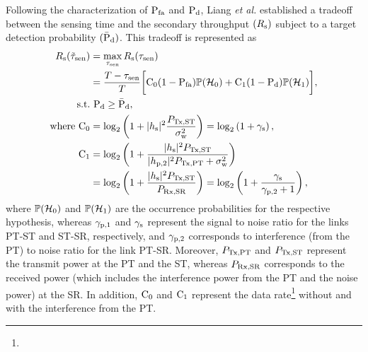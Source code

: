 Following the characterization of $\text{P}_{\text{fa}}$ and $\text{P}_{\text{d}}$, Liang \textit{et al.} \cite{Liang08} established a tradeoff between the sensing time and the secondary throughput $(R_{\text{s}})$ subject to a target detection probability $(\bar{\text{P}}_{\text{d}})$. This tradeoff is represented as  
\begin{align}
R_{\text{s}}(\tilde{\tau}_{\text{sen}}) &= \operatorname*{max}_{\tau_{\text{sen}}} R_{\text{s}}(\tau_{\text{sen}}) \nonumber \\&= \frac{T- \tau_{\text{sen}}}{T} \bigg[ \text{C}_{\text{0}} (1 - \text{P}_{\text{fa}}) \mathbb P(\mathcal{H}_0) +  \text{C}_{\text{1}} (1 - \text{P}_{\text{d}}) \mathbb P(\mathcal{H}_1)  \bigg], \label{eq_IS:thr_id} \\
\text{s.t.} & \text{ } \text{P}_{\text{d}} \ge \bar{\text{P}}_{\text{d}}, \label{eq_IS:thr_id_con} \\ 
\text{where } \text{C}_{\text{0}} &= \log_2 \left(1 + |h_{\text{s}}|^2 \frac{P_{\text{Tx,ST}}}{\sigma^2_{\text{w}}}\right) = \log_2 \left( 1 + {\gamma}_{\text{s}} \right) \label{eq_IS:Cap0},\\ 
\text{C}_{\text{1}} &= \log_2 \left(1 + \frac{|h_{\text{s}}|^2 P_{\text{Tx,ST}} }{|h_{\text{p,2}}|^2 P_{\text{Tx,PT}}  + \sigma^2_{\text{w}}} \right) \nonumber \\ \quad &= \log_2 \left(1 + \frac{|h_{\text{s}}|^2 P_{\text{Tx,ST}} }{P_{\text{Rx,SR}}} \right) = \log_2 \left(1 + \frac{{\gamma}_{\text{s}}}{{\gamma}_{\text{p,2}} + 1}  \right), \label{eq_IS:Cap1} 
\end{align}
where $\mathbb P(\mathcal{H}_0)$ and $\mathbb P(\mathcal{H}_1)$ are the occurrence probabilities for the respective hypothesis, whereas ${\gamma}_{\text{p,1}}$ and ${\gamma}_{\text{s}}$ represent the signal to noise ratio for the links PT-ST and ST-SR, respectively, and ${\gamma}_{\text{p,2}}$ corresponds to interference (from the PT) to noise ratio for the link PT-SR. Moreover, $P_{\text{Tx,PT}}$ and $P_{\text{Tx,ST}}$ represent the transmit power at the PT and the ST, whereas $P_{\text{Rx,SR}}$ corresponds to the received power (which includes the interference power from the PT and the noise power) at the SR. In addition, $\text{C}_{\text{0}}$ and $\text{C}_{\text{1}}$ represent the data rate\footnote{} without and with the interference from the PT. 

